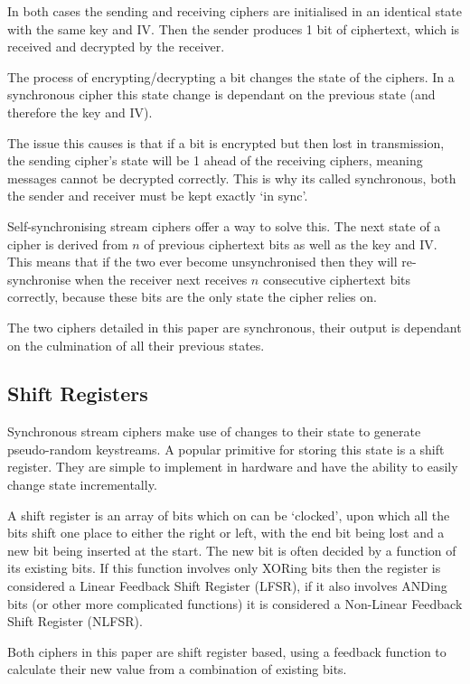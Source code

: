 \documentclass{report}
\let\Oldsubsection\subsection
\renewcommand{\subsection}{\FloatBarrier\Oldsubsection}
\begin{document}
In both cases the sending and receiving ciphers are initialised in an identical state with the same key and IV. Then the sender produces 1 bit of ciphertext, which is received and decrypted by the receiver.

The process of encrypting/decrypting a bit changes the state of the ciphers. In a synchronous cipher this state change is dependant on the previous state (and therefore the key and IV).

The issue this causes is that if a bit is encrypted but then lost in transmission, the sending cipher's state will be 1 ahead of the receiving ciphers, meaning messages cannot be decrypted correctly. This is why its called synchronous, both the sender and receiver must be kept exactly `in sync'.

Self-synchronising stream ciphers offer a way to solve this. The next state of a cipher is derived from $n$ of previous ciphertext bits as well as the key and IV. This means that if the two ever become unsynchronised then they will re-synchronise when the receiver next receives $n$ consecutive ciphertext bits correctly, because these bits are the only state the cipher relies on.

The two ciphers detailed in this paper are synchronous, their output is dependant on the culmination of all their previous states.

\subsection*{Shift Registers}
Synchronous stream ciphers make use of changes to their state to generate pseudo-random keystreams. A popular primitive for storing this state is a shift register. They are simple to implement in hardware\cite{shiftregistersHardware} and have the ability to easily change state incrementally.

A shift register is an array of bits which on can be `clocked', upon which all the bits shift one place to either the right or left, with the end bit being lost and a new bit being inserted at the start. The new bit is often decided by a function of its existing bits. If this function involves only XORing bits then the register is considered a Linear Feedback Shift Register (LFSR), if it also involves ANDing bits (or other more complicated functions) it is considered a Non-Linear Feedback Shift Register (NLFSR).

Both ciphers in this paper are shift register based, using a feedback function to calculate their new value from a combination of existing bits.
\end{document}
